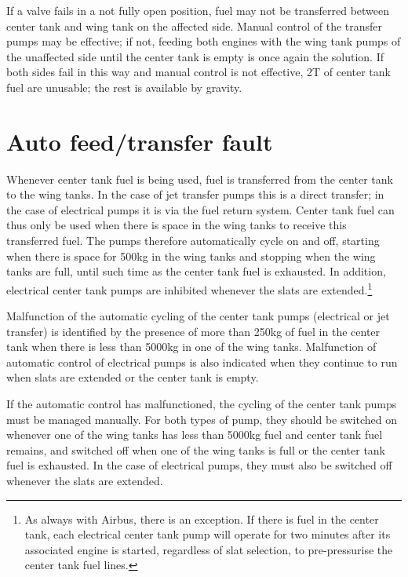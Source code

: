\documentclass[a5paper,11pt,twoside]{book}
\newcommand{\ac}[1]{{\scshape\MakeLowercase{#1}}}
\newcommand{\inlcite}[1]{{\ac{#1}}}
\newcommand{\multicite}[1]{%
  \nopagebreak
  \noindent{{\color{blue}\footnotesize[ \inlcite{#1} ]}}
}
\begin{document}
If a valve fails in a not fully open position, fuel may not be transferred
between center tank and wing tank on the affected side. Manual control of the
transfer pumps may be effective; if not, feeding both engines with the wing tank
pumps of the unaffected side until the center tank is empty is once again the
solution. If both sides fail in this way and manual control is not effective, 2T
of center tank fuel are unusable; the rest is available by gravity.

\multicite{\uline{FUEL}~CTR~L(R)(L+R)~XFR~FAULT, FCOM~PRO.AEP.FUEL}


\section{Auto feed/transfer fault}

Whenever center tank fuel is being used, fuel is transferred from the center
tank to the wing tanks. In the case of jet transfer pumps this is a direct
transfer; in the case of electrical pumps it is via the fuel return
system. Center tank fuel can thus only be used when there is space in the wing
tanks to receive this transferred fuel. The pumps therefore automatically cycle
on and off, starting when there is space for 500kg in the wing tanks and
stopping when the wing tanks are full, until such time as the center tank fuel
is exhausted. In addition, electrical center tank pumps are inhibited whenever
the slats are extended.\footnote{As always with Airbus, there is an
exception. If there is fuel in the center tank, each electrical center tank pump
will operate for two minutes after its associated engine is started, regardless
of slat selection, to pre-pressurise the center tank fuel lines.}

Malfunction of the automatic cycling of the center tank pumps (electrical or jet
transfer) is identified by the presence of more than 250kg of fuel in the center
tank when there is less than 5000kg in one of the wing tanks. Malfunction of
automatic control of electrical pumps is also indicated when they continue to
run when slats are extended or the center tank is empty.

If the automatic control has malfunctioned, the cycling of the center tank pumps
must be managed manually. For both types of pump, they should be switched on
whenever one of the wing tanks has less than 5000kg fuel and center tank fuel
remains, and switched off when one of the wing tanks is full or the center tank
fuel is exhausted. In the case of electrical pumps, they must also be switched
off whenever the slats are extended.
\end{document}
